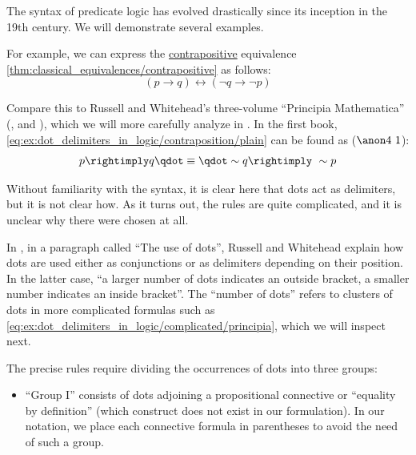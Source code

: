 \begin{example}\label{ex:dot_delimiters_in_logic}
  The syntax of predicate logic has evolved drastically since its inception in the 19th century. We will demonstrate several examples.

  \begin{thmenum}
     For example, we can express the \hyperref[def:conditional_formula/contrapositive]{contrapositive} equivalence \cref{thm:classical_equivalences/contrapositive} as follows:
    \begin{equation}\label{eq:ex:dot_delimiters_in_logic/contraposition/plain}
      (p \rightarrow q) \leftrightarrow (\neg q \rightarrow \neg p)
    \end{equation}

    Compare this to Russell and Whitehead's three-volume \enquote{Principia Mathematica} (\cite{WhiteheadRussell1927PrincipiaMathematicaVol1}, \cite{WhiteheadRussell1927PrincipiaMathematicaVol2} and \cite{WhiteheadRussell1927PrincipiaMathematicaVol3}), which we will more carefully analyze in . In the first book, \eqref{eq:ex:dot_delimiters_in_logic/contraposition/plain} can be found as (\( \anon 4 \ 1 \)):
    \begin{equation}\label{eq:ex:dot_delimiters_in_logic/contraposition/principia}
      p \rightimply q \qdot \equiv \qdot \sim q \rightimply \ \sim p
    \end{equation}

    Without familiarity with the syntax, it is clear here that dots act as delimiters, but it is not clear how. As it turns out, the rules are quite complicated, and it is unclear why there were chosen at all.

    In \cite[9]{WhiteheadRussell1927PrincipiaMathematicaVol1}, in a paragraph called \enquote{The use of dots}, Russell and Whitehead explain how dots are used either as conjunctions or as delimiters depending on their position. In the latter case, \enquote{a larger number of dots indicates an outside bracket, a smaller number indicates an inside bracket}. The \enquote{number of dots} refers to clusters of dots in more complicated formulas such as \eqref{eq:ex:dot_delimiters_in_logic/complicated/principia}, which we will inspect next.

    The precise rules require dividing the occurrences of dots into three groups:
    \begin{itemize}
      \item \enquote{Group I} consists of dots adjoining a propositional connective or \enquote{equality by definition} (which construct does not exist in our formulation). In our notation, we place each connective formula in parentheses to avoid the need of such a group.


\end{itemize}
\end{thmenum}
\end{example}
